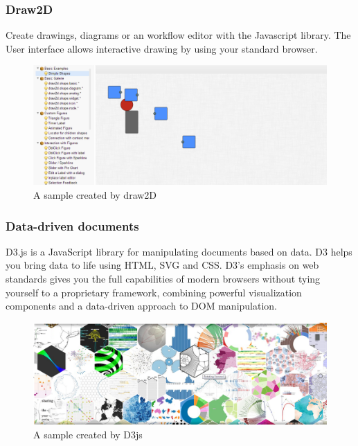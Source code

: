 \documentclass[14pt,a4paper]{extreport}
\begin{document}
 			\subsubsection{Draw2D}
 			Create drawings, diagrams or an workflow editor with the Javascript library. The User interface allows interactive drawing by using your standard browser.
 			\begin{figure}[ht]
 					\begin{center}
 						\includegraphics[scale=0.5]{draw2d.png}
 						\caption{A sample created by draw2D}
 					\end{center}
 				\end{figure} 	
 			\subsubsection{Data-driven documents}
 			D3.js is a JavaScript library for manipulating documents based on data. D3 helps you bring data to life using HTML, SVG and CSS. D3’s emphasis on web standards gives you the full capabilities of modern browsers without tying yourself to a proprietary framework, combining powerful visualization components and a data-driven approach to DOM manipulation.
 			  	\begin{figure}[ht]
 					\begin{center}
 						\includegraphics[scale=0.5]{d3js.png}
 						\caption{A sample created by D3js}
 					\end{center}
 				\end{figure} 	
 			
\end{document}
